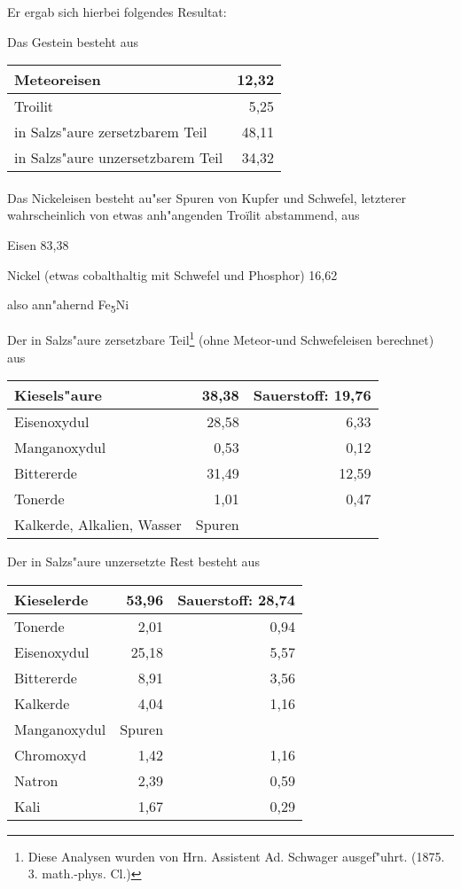 \documentclass[a4paper, 11pt, oneside]{article}
\begin{document}
Er ergab sich hierbei folgendes Resultat:

Das Gestein besteht aus
\begin{center}
    \begin{tabular}{ |l|r| } 
    \hline
    Meteoreisen & 12,32\\\hline
    Troilit & 5,25\\\hline
    in Salzs"aure zersetzbarem Teil & 48,11\\\hline
    in Salzs"aure unzersetzbarem Teil & 34,32\\
    \hline
    \end{tabular}
\end{center}
\paragraph{}
Das Nickeleisen besteht au"ser Spuren von Kupfer und Schwefel, letzterer wahrscheinlich von etwas anh"angenden Troïlit abstammend, aus

Eisen 83,38

Nickel (etwas cobalthaltig mit Schwefel und Phosphor) 16,62

also ann"ahernd Fe\textsubscript{5}Ni

Der in Salzs"aure zersetzbare Teil\footnote{Diese Analysen wurden von Hrn. Assistent Ad. Schwager ausgef"uhrt. (1875. 3. math.-phys. Cl.)} (ohne Meteor-und Schwefeleisen berechnet) aus
\begin{center}
    \begin{tabular}{ |l|r|r| } 
    \hline
    Kiesels"aure & 38,38 & Sauerstoff: 19,76\\\hline
    Eisenoxydul & 28,58 & 6,33\\\hline
    Manganoxydul & 0,53 & 0,12\\\hline
    Bittererde & 31,49 & 12,59\\\hline
    Tonerde & 1,01 & 0,47\\\hline
    Kalkerde, Alkalien, Wasser & Spuren &\\
    \hline
    \end{tabular}
\end{center}
Der in Salzs"aure unzersetzte Rest besteht aus
\begin{center}
    \begin{tabular}{ |l|r|r| } 
    \hline
    Kieselerde & 53,96 & Sauerstoff: 28,74\\\hline
    Tonerde & 2,01 & 0,94\\\hline
    Eisenoxydul & 25,18 & 5,57\\\hline
    Bittererde & 8,91 & 3,56\\\hline
    Kalkerde & 4,04 & 1,16\\\hline
    Manganoxydul & Spuren &\\\hline
    Chromoxyd & 1,42 & 1,16\\\hline
    Natron & 2,39 & 0,59\\\hline
    Kali & 1,67 & 0,29\\
    \hline
    \end{tabular}
\end{center}
\end{document}
